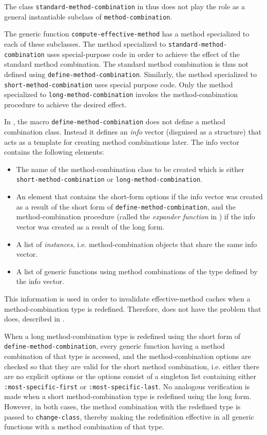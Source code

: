 The class \texttt{standard-method-combination} in \ccl{} thus does not
play the role as a general instantiable subclass of
\texttt{method-combination}.

The generic function \texttt{compute-effective-method} has a method
specialized to each of these subclasses.  The method specialized to
\texttt{standard-method-combination} uses special-purpose code in
order to achieve the effect of the standard method combination.  The
standard method combination is thus not defined using
\texttt{define-method-combination}.  Similarly, the method specialized
to \texttt{short-method-combination} uses special purpose code.  Only
the method specialized to \texttt{long-method-combination} invokes the
method-combination procedure to achieve the desired effect.

In \ccl{}, the macro \texttt{define-method-combination} does not
define a method combination class.  Instead it defines an \emph{info}
vector (disguised as a structure) that acts as a template for creating
method combinations later.  The info vector contains the following
elements:

\begin{itemize}
\item The name of the method-combination class to be created which is
  either \texttt{short-method-combination} or
  \texttt{long-method-combination}.
\item An element that contains the short-form options if the info
  vector was created as a result of the short form of
  \texttt{define-method-combination}, and the method-combination
  procedure (called the \emph{expander function} in \ccl{}) if the
  info vector was created as a result of the long form.
\item A list of \emph{instances}, i.e. method-combination objects that
  share the same info vector.
\item A list of generic functions using method combinations of the
  type defined by the info vector.
\end{itemize}

This information is used in order to invalidate effective-method
caches when a method-combination type is redefined.  Therefore, \ccl{}
does not have the problem that \pcl{} does, described in
.

When a long method-combination type is redefined using the short form
of \texttt{define-method-combination}, every generic function having
a method combination of that type is accessed, and the
method-combination options are checked so that they are valid for the
short method combination, i.e. either there are no explicit options or
the options consist of a singleton list containing either
\texttt{:most-specific-first} or \texttt{:most-specific-last}.  No
analogous verification is made when a short method-combination type is
redefined using the long form.  However, in both cases, the method
combination with the redefined type is passed to
\texttt{change-class}, thereby making the redefinition effective in
all generic functions with a method combination of that type.

